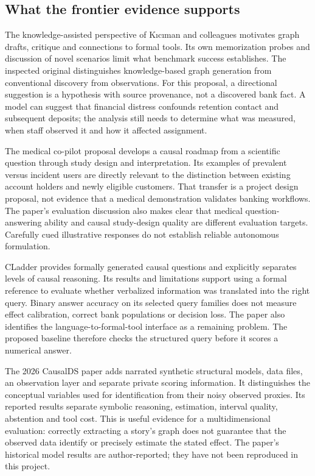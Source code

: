 \hypertarget{what-the-frontier-evidence-supports}{%
\subsection{What the frontier evidence
supports}\label{what-the-frontier-evidence-supports}}

The knowledge-assisted perspective of Kıcıman and colleagues motivates
graph drafts, critique and connections to formal tools. Its own
memorization probes and discussion of novel scenarios limit what
benchmark success establishes. The inspected original distinguishes
knowledge-based graph generation from conventional discovery from
observations. For this proposal, a directional suggestion is a
hypothesis with source provenance, not a discovered bank fact. A model
can suggest that financial distress confounds retention contact and
subsequent deposits; the analysis still needs to determine what was
measured, when staff observed it and how it affected assignment.
\citep{v12_la_2305_00050}

The medical co-pilot proposal develops a causal roadmap from a
scientific question through study design and interpretation. Its
examples of prevalent versus incident users are directly relevant to the
distinction between existing account holders and newly eligible
customers. That transfer is a project design proposal, not evidence that
a medical demonstration validates banking workflows. The paper's
evaluation discussion also makes clear that medical question-answering
ability and causal study-design quality are different evaluation
targets. Carefully cued illustrative responses do not establish reliable
autonomous formulation. \citep{v12_la_2407_19118}

CLadder provides formally generated causal questions and explicitly
separates levels of causal reasoning. Its results and limitations
support using a formal reference to evaluate whether verbalized
information was translated into the right query. Binary answer accuracy
on its selected query families does not measure effect calibration,
correct bank populations or decision loss. The paper also identifies the
language-to-formal-tool interface as a remaining problem. The proposed
baseline therefore checks the structured query before it scores a
numerical answer. \citep{v12_la_2312_04350}

The 2026 CausalDS paper adds narrated synthetic structural models, data
files, an observation layer and separate private scoring information. It
distinguishes the conceptual variables used for identification from
their noisy observed proxies. Its reported results separate symbolic
reasoning, estimation, interval quality, abstention and tool cost. This
is useful evidence for a multidimensional evaluation: correctly
extracting a story's graph does not guarantee that the observed data
identify or precisely estimate the stated effect. The paper's historical
model results are author-reported; they have not been reproduced in this
project. \citep{v12_la_2607_08093}


